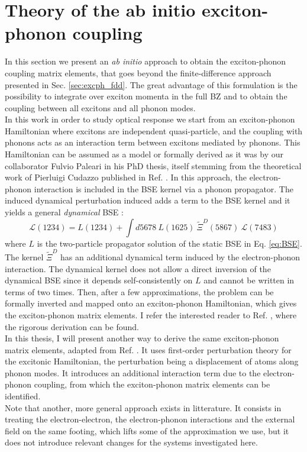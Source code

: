 %
\section{Theory of the ab initio exciton-phonon coupling} \label{sec:excph_ai}
In this section we present an \textit{ab initio} approach to obtain the exciton-phonon coupling matrix elements, that goes beyond the finite-difference approach presented in Sec. \ref{sec:excph_fdd}. The great advantage of this formulation is the possibility to integrate over exciton momenta in the full \acrlong{BZ} and to obtain the coupling between all excitons and all phonon modes.\\

In this work in order to study optical response we start from an exciton-phonon Hamiltonian where excitons are independent quasi-particle, and the coupling with phonons acts as an interaction term between excitons mediated by phonons. This Hamiltonian can be assumed as a model \cite{perebeinos2005effect, perebeinos2008phonon}
or formally derived as it was by our collaborator Fulvio Paleari in his PhD thesis, \cite{paleari2019first} itself stemming from the theoretical work of Pierluigi Cudazzo published in Ref. \cite{cudazzo2020first}. In this approach, the electron-phonon interaction is included in the \acrshort{BSE} kernel via a phonon propagator. 
The induced dynamical perturbation induced adds a term to the \acrshort{BSE} kernel and it yields a general \textit{dynamical} \acrlong{BSE} :
\begin{equation}
    \mathcal{L}(1234) = L(1234) + \int d5678 \ L(1625) \ \tilde{\Xi}^{D}(5867) \ \mathcal{L}(7483) \label{eq:dBSE}
\end{equation}
where $L$ is the two-particle propagator solution of the static \acrshort{BSE} in Eq. \eqref{eq:BSE}. The kernel $\tilde{\Xi}^{D}$ has an additional dynamical term induced by the electron-phonon interaction. The dynamical kernel does not allow a direct inversion of the dynamical \acrshort{BSE} since it depends self-consistently on $L$ and cannot be written in terms of two times. 
%
Then, after a few approximations, the problem can be formally inverted and mapped onto an exciton-phonon Hamiltonian, which gives the exciton-phonon matrix elements. I refer the interested reader to Ref. \cite{cudazzo2020first,paleari2019first}, where the rigorous derivation can be found.\\

In this thesis, I will present another way to derive the same exciton-phonon matrix elements, adapted from Ref. \cite{chen2020exciton}. It uses first-order perturbation theory for the excitonic Hamiltonian, the perturbation being a displacement of atoms along phonon modes. It introduces an additional interaction term due to the electron-phonon coupling, from which the exciton-phonon matrix elements can be identified. \\
Note that another, more general approach exists in litterature. It consists in treating the electron-electron, the electron-phonon interactions and the external field on the same footing,\cite{paleari2022exciton} which lifts some of the approximation we use, but it does not introduce relevant changes for the systems investigated here.\\

